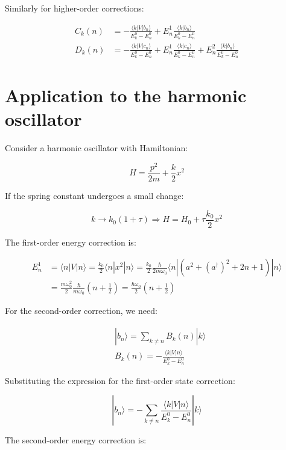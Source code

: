 Similarly for higher-order corrections:

\begin{align}
C_k(n)&=-\frac{\langle k|V|b_n\rangle}{E_k^0-E_n^0}+E_n^1\frac{\langle k|b_n\rangle}{E_k^0-E_n^0} \\
D_k(n)&=-\frac{\langle k|V|c_n\rangle}{E_k^0-E_n^0}+E_n^1\frac{\langle k|c_n\rangle}{E_k^0-E_n^0}+E_n^2\frac{\langle k|b_n\rangle}{E_k^0-E_n^0}
\end{align}

\section{Application to the harmonic oscillator}
Consider a harmonic oscillator with Hamiltonian:

\begin{equation}
H=\frac{p^2}{2m}+\frac{k}{2}x^2
\end{equation}

If the spring constant undergoes a small change:

\begin{equation}
k\rightarrow k_0(1+\tau)\Rightarrow H=H_0+\tau\frac{k_0}{2}x^2
\end{equation}

The first-order energy correction is:

\begin{align}
E_n^1&=\langle n|V|n\rangle=\frac{k_0}{2}\langle n|x^2|n\rangle=\frac{k_0}{2}\frac{\hbar}{2m\omega_0}\langle n|(a^2+(a^\dagger)^2+2n+1)|n\rangle\\
&=\frac{m\omega_0^2}{2}\frac{\hbar}{m\omega_0}(n+\frac{1}{2})=\frac{\hbar\omega_0}{2}(n+\frac{1}{2})
\end{align}

For the second-order correction, we need:

\begin{align}
&|b_n\rangle=\sum_{k\neq n}B_k(n)|k\rangle \\
&B_k(n)=-\frac{\langle k|V|n\rangle}{E_k^0-E_n^0}
\end{align}


Substituting the expression for the first-order state correction:

\begin{equation}
|b_n\rangle=-\sum_{k\neq n}\frac{\langle k|V|n\rangle}{E_k^0-E_n^0}|k\rangle
\end{equation}

The second-order energy correction is:

